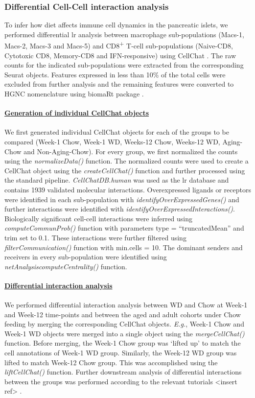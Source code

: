\subsubsection{\large Differential Cell-Cell interaction analysis}
To infer how diet affects immune cell dynamics in the pancreatic islets, we performed differential \gls{lr} analysis between macrophage sub-populations (Macs-1, Macs-2, Macs-3 and Macs-5) and CD8\textsuperscript{+} T-cell sub-populations (Naive-CD8, Cytotoxic CD8, Memory-CD8 and IFN-responsive) using CellChat \textbf{\cite{jin_cellchat_2023}}. The raw counts for the indicated sub-populations were extracted from the corresponding Seurat objects. Features expressed in less than 10\% of the total cells were excluded from further analysis and the remaining features were converted to HGNC nomenclature using biomaRt package \textbf{\cite{}}.\\\\
\underline{\normalsize \textbf{Generation of individual CellChat objects}}\\\\
We first generated individual CellChat objects for each of the groups to be compared (Week-1 Chow, Week-1 WD, Weeks-12 Chow, Weeks-12 WD, Aging-Chow and Non-Aging-Chow). For every group, we first normalized the counts using the \textit{normalizeData()} function. The normalized counts were used to create a CellChat object using the \textit{createCellChat()} function and further processed using the standard pipeline. \textit{CellChatDB.human} was used as the \gls{lr} database and contains 1939 validated molecular interactions. Overexpressed ligands or receptors were identified in each sub-population with \textit{identifyOverExpressedGenes()} and further interactions were identified with \textit{identifyOverExpressedInteractions()}. Biologically significant cell-cell interactions were inferred using \textit{computeCommunProb()} function with parameters type = “truncatedMean” and trim set to 0.1. These interactions were further filtered using \textit{filterCommunication()} function with min.cells = 10. The dominant senders and receivers in every sub-population were identified using \textit{netAnalysis\textunderscore computeCentrality()} function.\\\\
\underline{\normalsize \textbf{Differential interaction analysis}}\\\\
We performed differential interaction analysis between WD and Chow at Week-1 and Week-12 time-points and between the aged and adult cohorts under Chow feeding by merging the corresponding CellChat objects. \textit{E.g.}, Week-1 Chow and Week-1 WD objects were merged into a single object using the \textit{mergeCellChat()} function. Before merging, the Week-1 Chow group was ‘lifted up’ to match the cell annotations of Week-1 WD group. Similarly, the Week-12 WD group was lifted to match Week-12 Chow group. This was accomplished using the \textit{liftCellChat()} function. Further downstream analysis of differential interactions between the groups was performed according to the relevant tutorials <insert ref> .

